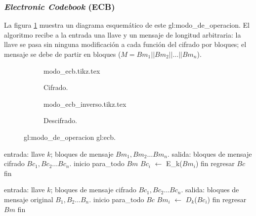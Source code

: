 %
%

\subsubsection{\textit{Electronic Codebook} (ECB)}

La figura \ref{figura:ecb} muestra un diagrama esquemático de este
\gls{gl:modo_de_operacion}. El algoritmo recibe a la entrada una llave y un
mensaje de longitud arbitraria: la llave se pasa sin ninguna modificación a
cada función del cifrado por bloques; el mensaje se debe de partir en bloques
($ M = Bm_1 || Bm_2 || \dots || Bm_n $).

\begin{figure}
  \centering
  \begin{subfigure}{0.45\textwidth}
    \begin{center}
      {modo_ecb.tikz.tex}
      \caption{Cifrado.}
    \end{center}
  \end{subfigure}
  \begin{subfigure}{0.45\textwidth}
    \begin{center}
      {modo_ecb_inverso.tikz.tex}
      \caption{Descifrado.}
    \end{center}
  \end{subfigure}
  \caption{\Gls{gl:modo_de_operacion} \gls{gl:ecb}.}
  \label{figura:ecb}
\end{figure}

\begin{pseudocodigo}[%
    caption={\Gls{gl:modo_de_operacion} \gls{gl:ecb}, cifrado.}%
  ]
    entrada: llave $ k $; bloques de mensaje $ Bm_1, Bm_2 \dots Bm_n $.
    salida:  bloques de mensaje cifrado $ Bc_1, Bc_2 \dots Bc_n $.
    inicio
      para_todo $Bm$
        $Bc_i$ $\gets$ E_k($Bm_i$)
      fin
      regresar $Bc$
    fin
\end{pseudocodigo}

\begin{pseudocodigo}[%
    caption={\Gls{gl:modo_de_operacion} \gls{gl:ecb}, descifrado.}%
  ]
    entrada: llave $ k $; bloques de mensaje cifrado $ Bc_1, Bc_2 \dots Bc_n $.
    salida:  bloques de mensaje original $ B_1, B_2 \dots B_n $.
    inicio
      para_todo $Bc$
        $Bm_i$ $\gets$ $D_k$($Bc_i$)
      fin
      regresar $Bm$
    fin
\end{pseudocodigo}
